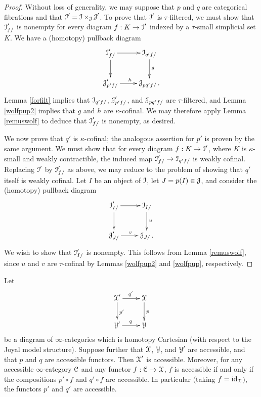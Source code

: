 \begin{proof}
Without loss of generality, we may suppose that $p$ and $q$ are categorical fibrations and that
$\operatorname{\mathcal{I}}' = \operatorname{\mathcal{I}} \times_{\operatorname{\mathcal{J}}} \operatorname{\mathcal{J}}'$. To prove that $\operatorname{\mathcal{I}}'$ is $\tau$-filtered, we must show that
$\operatorname{\mathcal{I}}'_{f/}$ is nonempty for every diagram $f: K \rightarrow \operatorname{\mathcal{I}}'$ indexed by a $\tau$-small simplicial set $K$. We have a (homotopy) pullback diagram
$$ \xymatrix{ \calI'_{f/} \ar[r] \ar[d] & \calI_{q'  f/} \ar[d]^{g} \\
\calJ'_{p'  f/} \ar[r]^{h} & \calJ_{p  q'  f/}. }$$
Lemma \ref{forfilt} implies that $\operatorname{\mathcal{I}}_{q'  f/}$, $\operatorname{\mathcal{J}}'_{p'  f/}$, and
$\operatorname{\mathcal{J}}_{p  q'  f/}$ are $\tau$-filtered, and Lemma \ref{wolfpup2} implies that
$g$ and $h$ are $\kappa$-cofinal. We may therefore apply Lemma \ref{remuswolf} to deduce
that $\operatorname{\mathcal{I}}'_{f/}$ is nonempty, as desired.

We now prove that $q'$ is $\kappa$-cofinal; the analogous assertion for $p'$ is proven by the same argument. We must show that for every diagram $f: K \rightarrow \operatorname{\mathcal{I}}'$, where $K$ is $\kappa$-small and weakly contractible, the induced map
$\operatorname{\mathcal{I}}'_{f/} \rightarrow \operatorname{\mathcal{I}}_{q'  f/}$ is weakly cofinal. Replacing $\operatorname{\mathcal{I}}'$ by $\operatorname{\mathcal{I}}'_{f/}$ as above, we
may reduce to the problem of showing that $q'$ itself is weakly cofinal. Let $I$ be an object of
$\operatorname{\mathcal{I}}$, let $J = p(I) \in \operatorname{\mathcal{J}}$, and consider the (homotopy) pullback diagram
$$ \xymatrix{ \calI'_{I/} \ar[r] \ar[d] & \calI_{I/} \ar[d]^{u} \\
\calJ'_{J/} \ar[r]^{v} & \calJ_{J/}. }$$
We wish to show that $\operatorname{\mathcal{I}}'_{I/}$ is nonempty. This follows from Lemma \ref{remuswolf}, since
$u$ and $v$ are $\tau$-cofinal by Lemmas \ref{wolfpup2} and \ref{wolfpup}, respectively.
\end{proof}

\begin{proposition}\label{horse2}
Let $$ \xymatrix{ \calX' \ar[r]^{q'} \ar[d]^{p'} & \calX \ar[d]^{p} \\
\calY' \ar[r]^{q} & \calY }$$
be a diagram of $\infty$-categories which is homotopy Cartesian (with respect to the Joyal model structure). Suppose further that $\operatorname{\mathcal{X}}$, $\operatorname{\mathcal{Y}}$, and $\operatorname{\mathcal{Y}}'$ are accessible, and that
$p$ and $q$ are accessible functors. Then $\operatorname{\mathcal{X}}'$ is accessible. Moreover, for any accessible $\infty$-category $\operatorname{\mathcal{C}}$ and any functor $f: \operatorname{\mathcal{C}} \rightarrow \operatorname{\mathcal{X}}$, $f$ is accessible if and only if the compositions $p' \circ f$ and $q' \circ f$ are accessible. In particular $($taking $f = \operatorname{id}_{\operatorname{\mathcal{X}}}${}$)$, the functors $p'$ and $q'$ are accessible.
\end{proposition}


